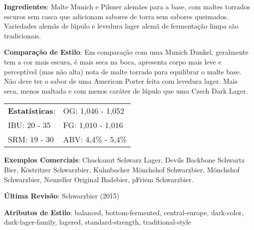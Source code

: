 \textbf{Ingredientes}: Malte Munich e Pilsner alemães para a base, com maltes torrados escuros sem casca que adicionam sabores de torra sem sabores queimados. Variedades alemãs de lúpulo e levedura lager alemã de fermentação limpa são tradicionais.

\textbf{Comparação de Estilo}: Em comparação com uma Munich Dunkel, geralmente tem a cor mais escura, é mais seca na boca, apresenta corpo mais leve e perceptível (mas não alta) nota de malte torrado para equilibrar o malte base. Não deve ter o sabor de uma American Porter feita com levedura lager. Mais seca, menos maltada e com menos caráter de lúpulo que uma Czech Dark Lager.

\begin{tabular}{@{}p{35mm}p{35mm}@{}}
  \textbf{Estatísticas}: & OG: 1,046 - 1,052 \\
  IBU: 20 - 35 & FG: 1,010 - 1,016 \\
  SRM: 19 - 30 & ABV: 4,4\% - 5,4\%
\end{tabular}

\textbf{Exemplos Comerciais}: Chuckanut Schwarz Lager, Devils Backbone Schwartz Bier, Köstritzer Schwarzbier, Kulmbacher Mönchshof Schwarzbier, Mönchshof Schwarzbier, Neuzeller Original Badebier, pFriem Schwarzbier.

\textbf{Última Revisão}: Schwarzbier (2015)

\textbf{Atributos de Estilo}: balanced, bottom-fermented, central-europe, dark-color, dark-lager-family, lagered, standard-strength, traditional-style
